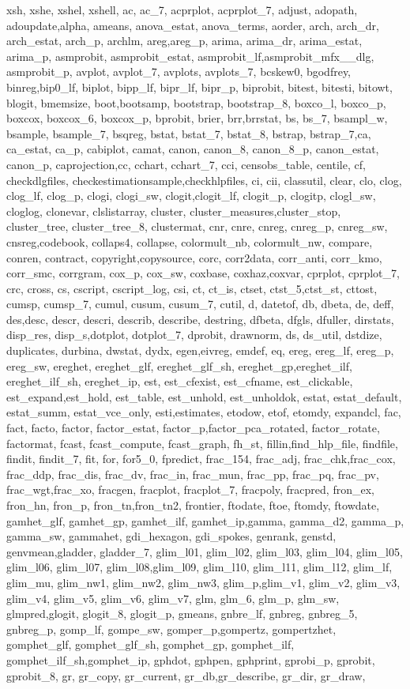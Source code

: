 {{xsh, xshe, xshel, xshell, ac, ac_7, acprplot, acprplot_7, adjust, adopath, adoupdate,alpha, ameans, anova_estat, anova_terms, aorder, arch, arch_dr, arch_estat, arch_p, archlm, areg,areg_p, arima, arima_dr, arima_estat, arima_p, asmprobit, asmprobit_estat, asmprobit_lf,asmprobit_mfx__dlg, asmprobit_p, avplot, avplot_7, avplots, avplots_7, bcskew0, bgodfrey, binreg,bip0_lf, biplot, bipp_lf, bipr_lf, bipr_p, biprobit, bitest, bitesti, bitowt, blogit, bmemsize, boot,bootsamp, bootstrap, bootstrap_8, boxco_l, boxco_p, boxcox, boxcox_6, boxcox_p, bprobit, brier, brr,brrstat, bs, bs_7, bsampl_w, bsample, bsample_7, bsqreg, bstat, bstat_7, bstat_8, bstrap, bstrap_7,ca, ca_estat, ca_p, cabiplot, camat, canon, canon_8, canon_8_p, canon_estat, canon_p, caprojection,cc, cchart, cchart_7, cci, censobs_table, centile, cf, checkdlgfiles, checkestimationsample,checkhlpfiles, ci, cii, classutil, clear, clo, clog, clog_lf, clog_p, clogi, clogi_sw, clogit,clogit_lf, clogit_p, clogitp, clogl_sw, cloglog, clonevar, clslistarray, cluster, cluster_measures,cluster_stop, cluster_tree, cluster_tree_8, clustermat, cnr, cnre, cnreg, cnreg_p, cnreg_sw, cnsreg,codebook, collaps4, collapse, colormult_nb, colormult_nw, compare, conren, contract, copyright,copysource, corc, corr2data, corr_anti, corr_kmo, corr_smc, corrgram, cox_p, cox_sw, coxbase, coxhaz,coxvar, cprplot, cprplot_7, crc, cross, cs, cscript, cscript_log, csi, ct, ct_is, ctset, ctst_5,ctst_st, cttost, cumsp, cumsp_7, cumul, cusum, cusum_7, cutil, d, datetof, db, dbeta, de, deff, des,desc, descr, descri, describ, describe, destring, dfbeta, dfgls, dfuller, dirstats, disp_res, disp_s,dotplot, dotplot_7, dprobit, drawnorm, ds, ds_util, dstdize, duplicates, durbina, dwstat, dydx, egen,eivreg, emdef, eq, ereg, ereg_lf, ereg_p, ereg_sw, ereghet, ereghet_glf, ereghet_glf_sh, ereghet_gp,ereghet_ilf, ereghet_ilf_sh, ereghet_ip, est, est_cfexist, est_cfname, est_clickable, est_expand,est_hold, est_table, est_unhold, est_unholdok, estat, estat_default, estat_summ, estat_vce_only, esti,estimates, etodow, etof, etomdy, expandcl, fac, fact, facto, factor, factor_estat, factor_p,factor_pca_rotated, factor_rotate, factormat, fcast, fcast_compute, fcast_graph, fh_st, fillin,find_hlp_file, findfile, findit, findit_7, fit, for, for5_0, fpredict, frac_154, frac_adj, frac_chk,frac_cox, frac_ddp, frac_dis, frac_dv, frac_in, frac_mun, frac_pp, frac_pq, frac_pv, frac_wgt,frac_xo, fracgen, fracplot, fracplot_7, fracpoly, fracpred, fron_ex, fron_hn, fron_p, fron_tn,fron_tn2, frontier, ftodate, ftoe, ftomdy, ftowdate, gamhet_glf, gamhet_gp, gamhet_ilf, gamhet_ip,gamma, gamma_d2, gamma_p, gamma_sw, gammahet, gdi_hexagon, gdi_spokes, genrank, genstd, genvmean,gladder, gladder_7, glim_l01, glim_l02, glim_l03, glim_l04, glim_l05, glim_l06, glim_l07, glim_l08,glim_l09, glim_l10, glim_l11, glim_l12, glim_lf, glim_mu, glim_nw1, glim_nw2, glim_nw3, glim_p,glim_v1, glim_v2, glim_v3, glim_v4, glim_v5, glim_v6, glim_v7, glm, glm_6, glm_p, glm_sw, glmpred,glogit, glogit_8, glogit_p, gmeans, gnbre_lf, gnbreg, gnbreg_5, gnbreg_p, gomp_lf, gompe_sw, gomper_p,gompertz, gompertzhet, gomphet_glf, gomphet_glf_sh, gomphet_gp, gomphet_ilf, gomphet_ilf_sh,gomphet_ip, gphdot, gphpen, gphprint, gprobi_p, gprobit, gprobit_8, gr, gr_copy, gr_current, gr_db,gr_describe, gr_dir, gr_draw, }}

